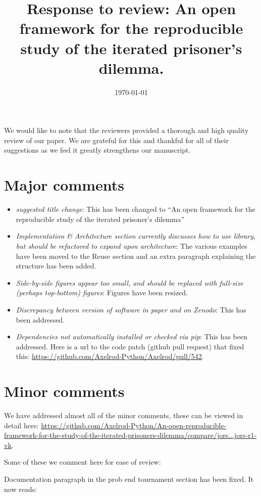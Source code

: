 \documentclass{article}
\title{Response to review: An open framework for the reproducible study of the
iterated prisoner's dilemma.}
\date{\today}
\begin{document}
\maketitle

We would like to note that the reviewers provided a thorough and high quality
review of our paper. We are grateful for this and thankful for all of their
suggestions as we feel it greatly strengthens our manuscript.

\section{Major comments}


\begin{itemize}
\item \textit{suggested title change}: This has been changed to ``An open
    framework for the reproducible study of the iterated prisoner's dilemma''
\item \textit{Implementation \& Architecture section currently discusses how to
    use library, but should be refactored to expand upon architecture}: The
    various examples have been moved to the Reuse section and an extra paragraph
    explaining the structure has been added.
\item \textit{Side-by-side figures appear too small, and should be replaced with
    full-size (perhaps top-bottom) figures}: Figures have been resized.
\item \textit{Discrepancy between version of software in paper and on Zenodo}:
    This has been addressed.
\item \textit{Dependencies not automatically installed or checked via pip}: This
    has been addressed. Here is a url to the code patch (github pull request)
    that fixed this: \url{https://github.com/Axelrod-Python/Axelrod/pull/542}.
\end{itemize}

\section{Minor comments}

We have addressed almost all of the minor comments, these can be viewed in
detail here:
\url{https://github.com/Axelrod-Python/An-open-reproducible-framework-for-the-study-of-the-iterated-prisoners-dilemma/compare/jors...jors-r1-vk}.

Some of these we comment here for ease of review:

Documentation paragraph in the prob end tournament section has been fixed. It
now reads:
\end{document}

